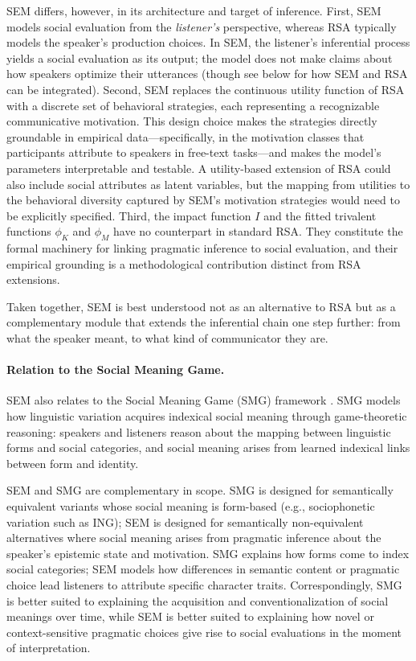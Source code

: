 \documentclass[12pt,a4paper]{article}
\begin{document}
SEM differs, however, in its architecture and target of inference. First, SEM
models social evaluation from the \emph{listener's} perspective, whereas RSA
typically models the speaker's production choices. In SEM, the listener's
inferential process yields a social evaluation as its output; the model does not
make claims about how speakers optimize their utterances (though see below for
how SEM and RSA can be integrated). Second, SEM replaces the continuous utility
function of RSA with a discrete set of behavioral strategies, each representing a
recognizable communicative motivation. This design choice makes the strategies
directly groundable in empirical data---specifically, in the motivation classes
that participants attribute to speakers in free-text tasks---and makes the model's
parameters interpretable and testable. A utility-based extension of RSA could
also include social attributes as latent variables, but the mapping from
utilities to the behavioral diversity captured by SEM's motivation strategies
would need to be explicitly specified. Third, the impact function $I$ and the
fitted trivalent functions $\phi_K$ and $\phi_M$ have no counterpart in standard
RSA. They constitute the formal machinery for linking pragmatic inference to
social evaluation, and their empirical grounding is a methodological contribution
distinct from RSA extensions.

Taken together, SEM is best understood not as an alternative to RSA but as a
complementary module that extends the inferential chain one step further: from
what the speaker meant, to what kind of communicator they are.

\paragraph{Relation to the Social Meaning Game.}
SEM also relates to the Social Meaning Game (SMG) framework
\citep{burnett2017,burnett2019,burnett2023}. SMG models how linguistic variation
acquires indexical social meaning through game-theoretic reasoning: speakers and
listeners reason about the mapping between linguistic forms and social categories,
and social meaning arises from learned indexical links between form and identity.

SEM and SMG are complementary in scope. SMG is designed for semantically
equivalent variants whose social meaning is form-based (e.g., sociophonetic
variation such as ING); SEM is designed for semantically non-equivalent
alternatives where social meaning arises from pragmatic inference about the
speaker's epistemic state and motivation. SMG explains how forms come to index
social categories; SEM models how differences in semantic content or pragmatic
choice lead listeners to attribute specific character traits. Correspondingly, SMG
is better suited to explaining the acquisition and conventionalization of social
meanings over time, while SEM is better suited to explaining how novel or
context-sensitive pragmatic choices give rise to social evaluations in the moment
of interpretation.
\end{document}
